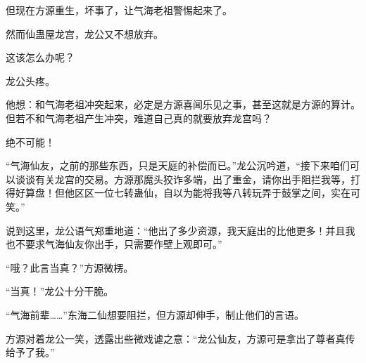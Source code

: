 \begin{this_body}
但现在方源重生，坏事了，让气海老祖警惕起来了。

然而仙蛊屋龙宫，龙公又不想放弃。

这该怎么办呢？

龙公头疼。

他想：和气海老祖冲突起来，必定是方源喜闻乐见之事，甚至这就是方源的算计。但若不和气海老祖产生冲突，难道自己真的就要放弃龙宫吗？

绝不可能！

“气海仙友，之前的那些东西，只是天庭的补偿而已。”龙公沉吟道，“接下来咱们可以谈谈有关龙宫的交易。方源那魔头狡诈多端，出了重金，请你出手阻拦我等，打得好算盘！但他区区一位七转蛊仙，自以为能将我等八转玩弄于鼓掌之间，实在可笑。”

说到这里，龙公语气郑重地道：“他出了多少资源，我天庭出的比他更多！并且我也不要求气海仙友你出手，只需要作壁上观即可。”

“哦？此言当真？”方源微楞。

“当真！”龙公十分干脆。

“气海前辈……”东海二仙想要阻拦，但方源却伸手，制止他们的言语。

方源对着龙公一笑，透露出些微戏谑之意：“龙公仙友，方源可是拿出了尊者真传给予了我。”

\end{this_body}

